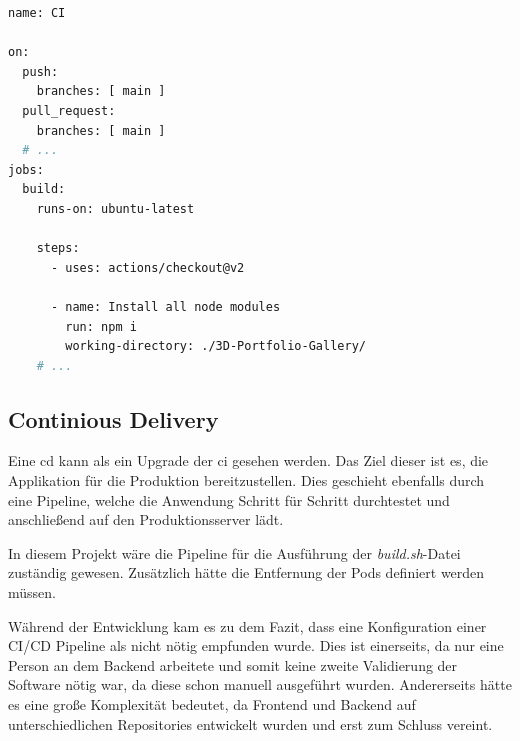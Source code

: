\begin{lstlisting}[label=lst:cipipeline, language=bash, caption=Pipeline einer CI]
name: CI

on:
  push:
    branches: [ main ]
  pull_request:
    branches: [ main ]
  # ...
jobs:
  build:
    runs-on: ubuntu-latest

    steps:
      - uses: actions/checkout@v2

      - name: Install all node modules
        run: npm i 
        working-directory: ./3D-Portfolio-Gallery/
    # ...

\end{lstlisting}

\subsection{Continious Delivery}

Eine \gls{cd} kann als ein Upgrade der \gls{ci} gesehen werden. 
Das Ziel dieser ist es, die Applikation für die Produktion bereitzustellen. 
Dies geschieht ebenfalls durch eine Pipeline, welche die Anwendung Schritt für Schritt durchtestet und anschließend auf den Produktionsserver lädt. 
\cite{cicdabout}

In diesem Projekt wäre die Pipeline für die Ausführung der \emph{build.sh}-Datei zuständig gewesen. 
Zusätzlich hätte die Entfernung der Pods definiert werden müssen. 

Während der Entwicklung kam es zu dem Fazit, dass eine Konfiguration einer CI/CD Pipeline als nicht nötig empfunden wurde. 
Dies ist einerseits, da nur eine Person an dem Backend arbeitete und somit keine zweite Validierung der Software nötig war, da diese schon manuell ausgeführt wurden. 
Andererseits hätte es eine große Komplexität bedeutet, da Frontend und Backend auf unterschiedlichen Repositories entwickelt wurden und erst zum Schluss vereint. 
 